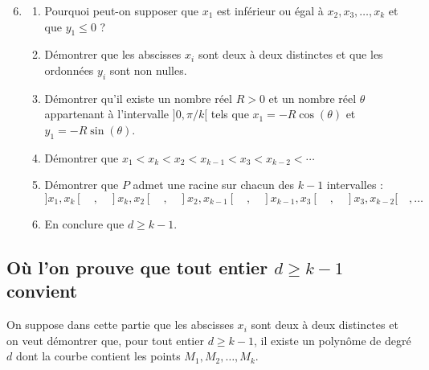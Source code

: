 \documentclass[landscape,twocolumn,leqno,a4paper,10pt]{report} %
\renewcommand{\geq}{\geqslant}
\begin{document}
\begin{enumerate}\setcounter{enumi}{5}
	\item \begin{enumerate}
		\item Pourquoi peut-on supposer que $x_{1}$ est inférieur ou égal à $x_{2}, x_{3}, \ldots, x_{k}$ et que $y_{1} \leqslant 0$ ?
		\item Démontrer que les abscisses $x_{i}$ sont deux à deux distinctes et que les ordonnées $y_{i}$ sont non nulles.
		\item Démontrer qu'il existe un nombre réel $R>0$ et un nombre réel $\theta$ appartenant à l'intervalle $]0, \pi / k[$  tels que $x_{1}=-R \cos (\theta)$ et $y_{1}=-R \sin (\theta)$.
		\item Démontrer que $x_{1}<x_{k}<x_{2}<x_{k-1}<x_{3}<x_{k-2}<\cdots$
		\item Démontrer que $P$ admet une racine sur chacun des $k-1$ intervalles :
		$$]x_{1},x_{k}[ \quad ,\quad ]x_{k},x_{2}[ \quad,\quad ]x_{2},x_{k-1}[ \quad,\quad ]x_{k-1},x_{3}[ \quad,\quad ]x_{3},x_{k-2}[ \quad, \ldots$$
		\item En conclure que $d \geq k-1$.
	\end{enumerate}
\end{enumerate}


\subsection{Où l'on prouve que tout entier $d \geq k-1$ convient}


On suppose dans cette partie que les abscisses $x_{i}$ sont deux à deux distinctes et on veut démontrer que, pour tout entier $d \geq k-1$, il existe un polynôme de degré $d$ dont la courbe contient les points $M_{1}, M_{2}, \ldots, M_{k}$.
\end{document}
